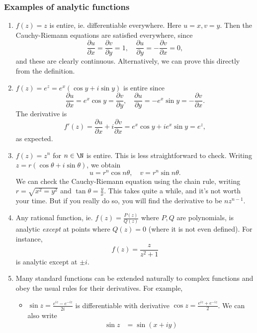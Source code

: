 \documentclass[a4paper]{article}
\begin{document}
\subsubsection*{Examples of analytic functions}
\begin{eg}\leavevmode
  \begin{enumerate}
    \item $f(z) = z$ is entire, ie. differentiable everywhere. Here $u = x, v = y$. Then the Cauchy-Riemann equations are satisfied everywhere, since
      \[
        \frac{\partial u}{\partial x} = \frac{\partial v}{\partial y} = 1,\quad \frac{\partial u}{\partial y} = -\frac{\partial v}{\partial x} = 0,
      \]
      and these are clearly continuous. Alternatively, we can prove this directly from the definition.
    \item $f(z) = e^z = e^x (\cos y + i \sin y)$ is entire since
      \[
        \frac{\partial u}{\partial x} = e^x \cos y = \frac{\partial v}{\partial y},\quad \frac{\partial u}{\partial y} = - e^x \sin y = -\frac{\partial v}{\partial x}.
      \]
      The derivative is
      \[
        f'(z) = \frac{\partial u}{\partial x} + i \frac{\partial v}{\partial x} = e^x \cos y + i e^x \sin y = e^z,
      \]
      as expected.
    \item $f(z) = z^n$ for $n \in \N$ is entire. This is less straightforward to check. Writing $z = r(\cos \theta + i \sin \theta)$, we obtain
      \[
        u = r^n \cos n\theta,\quad v = r^n \sin n\theta.
      \]
      We can check the Cauchy-Riemann equation using the chain rule, writing $r = \sqrt{x^2 = y^2}$ and $\tan \theta = \frac{y}{x}$. This takes quite a while, and it's not worth your time. But if you really do so, you will find the derivative to be $nz^{n - 1}$.
    \item Any rational function, ie. $f(z) = \frac{P(z)}{Q(z)}$ where $P, Q$ are polynomials, is analytic \emph{except} at points where $Q(z) = 0$ (where it is not even defined). For instance,
      \[
        f(z) = \frac{z}{z^2 + 1}
      \]
      is analytic except at $\pm i$.
    \item Many standard functions can be extended naturally to complex functions and obey the usual rules for their derivatives. For example,
      \begin{itemize}
        \item $\sin z = \frac{e^{iz} - e^{-iz}}{2i}$ is differentiable with derivative $\cos z = \frac{e^{iz} + e^{-iz}}{2}$. We can also write
          \begin{align*}
            \sin z &= \sin (x + iy) \\

\end{align*}
\end{itemize}
\end{enumerate}
\end{eg}
\end{document}
